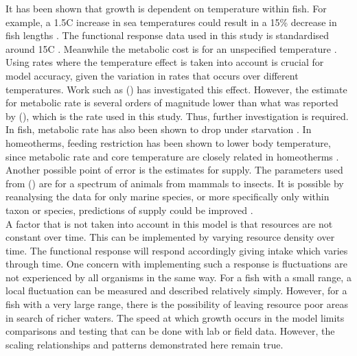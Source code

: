 \documentclass[a4paper, 11pt, hidelinks]{article} %
\begin{document}
	It has been shown that growth is dependent on temperature within fish. %
	For example, a 1.5\textdegree{}C increase in sea temperatures could result in a 15\% decrease in fish lengths \parencite{VanRijn2017}. %
	The functional response data used in this study is standardised around 15\textdegree{}C \parencite{Pawar2012}.
	Meanwhile the metabolic cost is for an unspecified temperature \parencite{Peters1983}.  Using rates where the temperature effect is taken into account is crucial for model accuracy, given the variation in rates that occurs over different temperatures.  Work such as \citeauthor{Barneche2014} (\citeyear{Barneche2014}) has investigated this effect.  However, the estimate for metabolic rate is several orders of magnitude lower than what was reported by \citeauthor{Peters1983} (\citeyear{Peters1983}), which is the rate used in this study.  Thus, further investigation is required.  %
	\\
	In fish, metabolic rate has also been shown to drop under starvation \parencite{Cook2000}.  In homeotherms, feeding restriction has been shown to lower body temperature, since metabolic rate and core temperature are closely related in homeotherms \parencite{Ballor1991, Blanc2003,}.  
	\\
	Another possible point of error is the estimates for supply.  The parameters used from \citeauthor{Pawar2012} (\citeyear{Pawar2012}) are for a spectrum of animals from mammals to insects.  It is possible by reanalysing the data for only marine species, or more specifically only within taxon or species, predictions of supply could be improved \parencite{Marshall2019}.  %
	\\
	A factor that is not taken into account in this model is that resources are not constant over time.  This can be implemented by varying resource density over time.  The functional response will respond accordingly giving intake which varies through time.  One concern with implementing such a response is fluctuations are not experienced by all organisms in the same way.  For a fish with a small range, a local fluctuation can be measured and described relatively simply.  However, for a fish with a very large range, there is the possibility of leaving resource poor areas in search of richer waters.
	The speed at which growth occurs in the model limits comparisons and testing that can be done with lab or field data.  However, the scaling relationships and patterns demonstrated here remain true.
\end{document}
